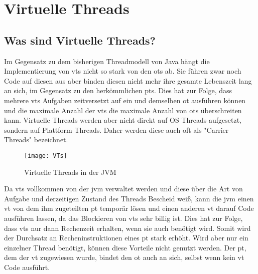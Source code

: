     

\section{Virtuelle Threads}                                 %
\label{sec:VirtuelleThreads}



\subsection{Was sind Virtuelle Threads?}
\label{subsec:WassindVTs?}

    Im Gegensatz zu dem bisherigen Threadmodell von Java hängt die Implementierung von \Glspl{vt} nicht so stark von den \Glspl{ot} ab. Sie führen zwar noch Code 
    auf diesen aus aber binden diesen nicht mehr ihre gesamte Lebenszeit lang an sich, im Gegensatz zu den herkömmlichen \Glspl{pt}. Dies hat zur Folge, 
    dass mehrere \Glspl{vt} Aufgaben zeitversetzt auf ein und demselben \gls{ot} ausführen können und die maximale Anzahl der \Glspl{vt}
    die maximale Anzahl von \Glspl{ot} überschreiten kann.
    Virtuelle Threads werden aber nicht direkt auf OS Threads aufgesetzt, sondern auf Plattform Threads.
    Daher werden diese auch oft als "Carrier Threads" bezeichnet.
    \cite{ieee2022}

    \begin{figure}[H]
        \centering
        \texttt{[image: VTs]}
        \caption{Virtuelle Threads in der JVM}
        \label{fig:VTs}
    \end{figure}

    Da \Glspl{vt} vollkommen von der \gls{jvm} verwaltet werden und diese über die Art von Aufgabe und derzeitigen Zustand des Threads Bescheid weiß, kann die
    \gls{jvm} einen \gls{vt} von dem ihm zugeteilten \gls{pt} temporär lösen und einen anderen \gls{vt} darauf Code ausführen lassen, da das Blockieren von \Glspl{vt}
    sehr billig ist. Dies hat zur Folge, dass \Glspl{vt} nur dann Rechenzeit erhalten, wenn sie auch benötigt wird. Somit wird der Durchsatz an Recheninstruktionen
    eines \gls{pt} stark erhöht.
    Wird aber nur ein einzelner Thread benötigt, können diese Vorteile nicht genutzt werden. Der \gls{pt}, dem der \gls{vt} zugewiesen wurde, bindet den \gls{ot} auch
    an sich, selbst wenn kein \gls{vt} Code ausführt.
    \cite{JEP444}

